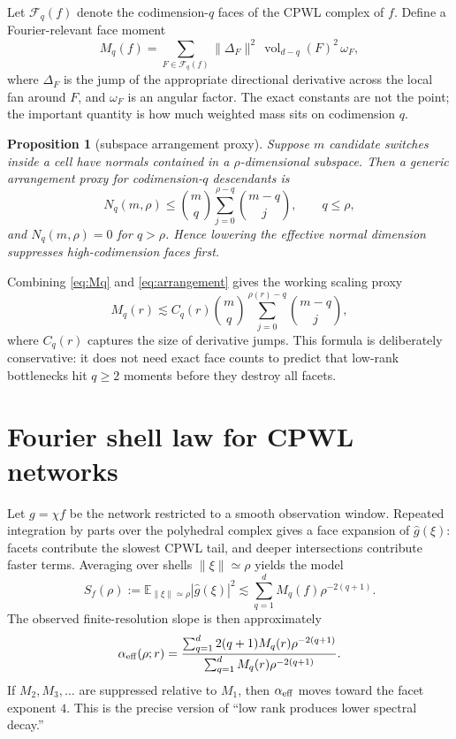 \documentclass[10pt,twocolumn]{article}
\newtheorem{proposition}{Proposition}
\newcommand{\E}{\mathbb{E}}
\newcommand{\1}{\mathbf{1}}
\newcommand{\cF}{\mathcal{F}}
\newcommand{\wh}{\widehat}
\begin{document}
Let $\cF_q(f)$ denote the codimension-$q$ faces of the CPWL complex of $f$.  Define a Fourier-relevant face moment
\begin{equation}\label{eq:Mq}
M_q(f)=\sum_{F\in\cF_q(f)} \|\Delta_F\|^2\,\operatorname{vol}_{d-q}(F)^2\,\omega_F,
\end{equation}
where $\Delta_F$ is the jump of the appropriate directional derivative across the local fan around $F$, and $\omega_F$ is an angular factor.  The exact constants are not the point; the important quantity is how much weighted mass sits on codimension $q$.

\begin{proposition}[subspace arrangement proxy]
Suppose $m$ candidate switches inside a cell have normals contained in a $\rho$-dimensional subspace.  Then a generic arrangement proxy for codimension-$q$ descendants is
\begin{equation}\label{eq:arrangement}
N_q(m,\rho)\le {m\choose q}\sum_{j=0}^{\rho-q}{m-q\choose j},\qquad q\le \rho,
\end{equation}
and $N_q(m,\rho)=0$ for $q>\rho$.  Hence lowering the effective normal dimension suppresses high-codimension faces first.
\end{proposition}

Combining \eqref{eq:Mq} and \eqref{eq:arrangement} gives the working scaling proxy
\begin{equation}\label{eq:Mqproxy}
M_q(r)\lesssim C_q(r) {m\choose q}\sum_{j=0}^{\rho(r)-q}{m-q\choose j},
\end{equation}
where $C_q(r)$ captures the size of derivative jumps.  This formula is deliberately conservative: it does not need exact face counts to predict that low-rank bottlenecks hit $q\ge2$ moments before they destroy all facets.

\section{Fourier shell law for CPWL networks}
Let $g=\chi f$ be the network restricted to a smooth observation window.  Repeated integration by parts over the polyhedral complex gives a face expansion of $\wh g(\xi)$: facets contribute the slowest CPWL tail, and deeper intersections contribute faster terms.  Averaging over shells $\|\xi\|\simeq\rho$ yields the model
\begin{equation}\label{eq:shelllaw}
S_f(\rho):=\E_{\|\xi\|\simeq\rho}|\wh g(\xi)|^2
\lesssim \sum_{q=1}^{d} M_q(f)\rho^{-2(q+1)}.
\end{equation}
The observed finite-resolution slope is then approximately
\begin{equation}\label{eq:alphaeff}
\alpha_{\rm eff}(\rho;r)=
\frac{\sum_{q=1}^{d}2(q+1)M_q(r)\rho^{-2(q+1)}}
{\sum_{q=1}^{d}M_q(r)\rho^{-2(q+1)}}.
\end{equation}
If $M_2,M_3,\ldots$ are suppressed relative to $M_1$, then $\alpha_{\rm eff}$ moves toward the facet exponent $4$.  This is the precise version of ``low rank produces lower spectral decay.''
\end{document}
